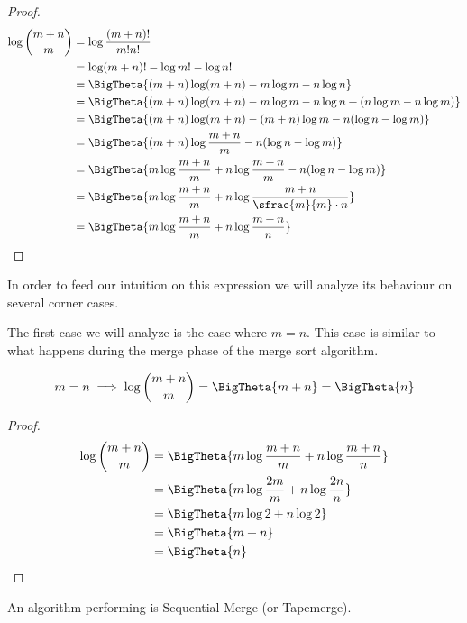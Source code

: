 \begin{proof}
\begin{align*}
\log\binom{m+n}{m} &= \log\frac{(m+n)!}{m!n!}\\
&= \log(m+n)! - \log m! - \log n!\\
&= \BigTheta{(m+n) \log(m+n) - m \log m - n \log n}\\
&= \BigTheta{(m+n) \log(m+n) - m \log m - n \log n + (n \log m - n \log m)}\\
&= \BigTheta{(m+n) \log(m+n) - (m+n) \log m - n (\log n - \log m)}\\
&= \BigTheta{(m+n) \log\frac{m+n}{m} - n (\log n - \log m)}\\
&= \BigTheta{m \log\frac{m+n}{m} + n \log\frac{m+n}{m} - n (\log n - \log m)}\\
&= \BigTheta{m \log\frac{m+n}{m} + n \log\frac{m+n}{\sfrac{m}{m} \cdot n}}\\
&= \BigTheta{m \log\frac{m+n}{m} + n \log\frac{m+n}{n}}\\
\end{align*}
\end{proof}

In order to feed our intuition on this expression we will analyze its behaviour
on several corner cases.

The first case we will analyze is the case where $m = n$. This case is similar
to what happens during the merge phase of the merge sort algorithm.

\begin{lemma}
\begin{align*}
m = n &\implies \log\binom{m+n}{m} = \BigTheta{m + n} = \BigTheta{n}\\
\end{align*}
\end{lemma}

\begin{proof}
\begin{align*}
\log\binom{m+n}{m} &= \BigTheta{m \log\frac{m+n}{m} + n \log\frac{m+n}{n}}\\
&= \BigTheta{m \log\frac{2m}{m} + n \log\frac{2n}{n}}\\
&= \BigTheta{m \log 2 + n \log 2}\\
&= \BigTheta{m + n}\\
&= \BigTheta{n}\\
\end{align*}
\end{proof}

An algorithm performing  is Sequential Merge (or Tapemerge).

